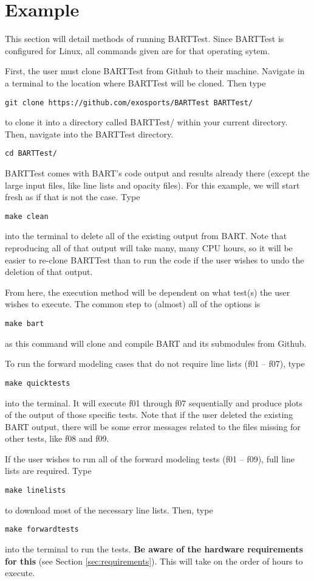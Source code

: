 \documentclass[letterpaper, 12pt]{article}
\begin{document}
\section{Example}
\label{sec:example}
This section will detail methods of running BARTTest. Since BARTTest is 
configured for Linux, all commands given are for that operating sytem.

First, the user must clone BARTTest from Github to their machine. 
Navigate in a terminal to the location where BARTTest will be cloned. 
Then type
\begin{verbatim}
git clone https://github.com/exosports/BARTTest BARTTest/
\end{verbatim}
to clone it into a directory called BARTTest/ within your current directory.
Then, navigate into the BARTTest directory.
\begin{verbatim}
cd BARTTest/
\end{verbatim}

BARTTest comes with BART's code output and results already there (except the large input files, like line lists and opacity files). For this example, we will start fresh as if that is not the case. Type
\begin{verbatim}
make clean
\end{verbatim}
into the terminal to delete all of the existing output from BART. Note that 
reproducing all of that output will take many, many CPU hours, so it will 
be easier to re-clone BARTTest than to run the code if the user wishes to 
undo the deletion of that output.

From here, the execution method will be dependent on what test(s) the user 
wishes to execute. The common step to (almost) all of the options is
\begin{verbatim}
make bart
\end{verbatim}
as this command will clone and compile BART and its submodules from Github. 

To run the forward modeling cases that do not require line lists (f01 
-- f07), type
\begin{verbatim}
make quicktests
\end{verbatim}
into the terminal. It will execute f01 through f07 sequentially and produce 
plots of the output of those specific tests. Note that if the user deleted 
the existing BART output, there will be some error messages related to the 
files missing for other tests, like f08 and f09.

If the user wishes to run all of the forward modeling tests (f01 -- f09), full line lists are required.
Type
\begin{verbatim}
make linelists
\end{verbatim}
to download most of the necessary line lists. Then, type
\begin{verbatim}
make forwardtests
\end{verbatim}
into the terminal to run the tests. \textbf{Be aware of the hardware requirements for this} 
(see Section \ref{sec:requirements}). This will take on the order of hours 
to execute.
\end{document}
